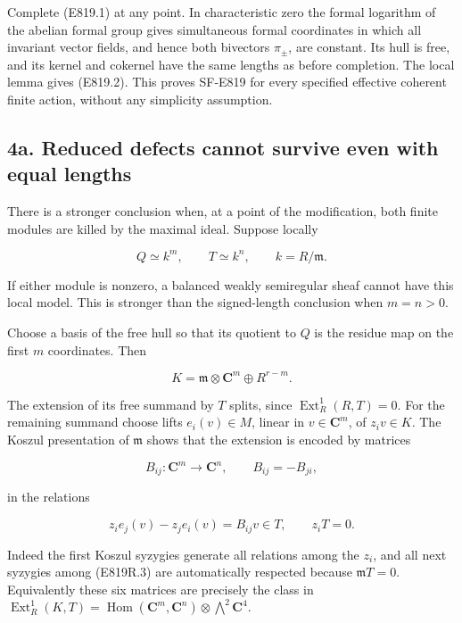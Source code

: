 Complete (E819.1) at any point. In characteristic zero the formal
logarithm of the abelian formal group gives simultaneous formal
coordinates in which all invariant vector fields, and hence both
bivectors \(\pi_\pm\), are constant. Its hull is free, and its kernel
and cokernel have the same lengths as before completion. The local lemma
gives (E819.2). This proves SF-E819 for every specified effective
coherent finite action, without any simplicity assumption.

\subsection{4a. Reduced defects cannot survive even with equal
lengths}\label{SF-E819-a.-reduced-defects-cannot-survive-even-with-equal-lengths}

There is a stronger conclusion when, at a point of the modification,
both finite modules are killed by the maximal ideal. Suppose locally

\[
 Q\simeq k^m,\qquad T\simeq k^n,\qquad k=R/\mathfrak m.
 \tag{E819R.1}
\]

If either module is nonzero, a balanced weakly semiregular sheaf cannot
have this local model. This is stronger than the signed-length
conclusion when \(m=n>0\).

Choose a basis of the free hull so that its quotient to \(Q\) is the
residue map on the first \(m\) coordinates. Then

\[
 K=\mathfrak m\otimes\mathbf C^m\oplus R^{r-m}.
 \tag{E819R.2}
\]

The extension of its free summand by \(T\) splits, since
\(\operatorname{Ext}^1_R(R,T)=0\). For the remaining summand choose
lifts \(e_i(v)\in M\), linear in \(v\in\mathbf C^m\), of \(z_i v\in K\).
The Koszul presentation of \(\mathfrak m\) shows that the extension is
encoded by matrices

\[
 B_{ij}:\mathbf C^m\longrightarrow\mathbf C^n,\qquad
 B_{ij}=-B_{ji},
\]

in the relations

\[
 z_i e_j(v)-z_j e_i(v)=B_{ij}v\in T,
 \qquad z_i T=0.
 \tag{E819R.3}
\]

Indeed the first Koszul syzygies generate all relations among the
\(z_i\), and all next syzygies among (E819R.3) are automatically
respected because \(\mathfrak m T=0\). Equivalently these six matrices
are precisely the class in
\(\operatorname{Ext}^1_R(K,T)=\operatorname{Hom}(\mathbf C^m,\mathbf C^n)\otimes\bigwedge^2\mathbf C^4\).

